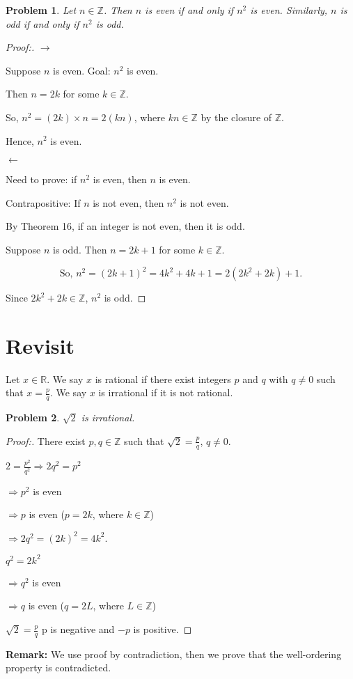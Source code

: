 \documentclass[12pt]{article}
\newtheorem{theorem}{Problem}[section]
\begin{document}
\newpage

\begin{theorem}
Let $n \in \mathbb{Z}$. Then $n$ is even if and only if $n^2$ is even. Similarly, $n$ is odd if and only if $n^2$ is odd.
\end{theorem}

\begin{proof}[Proof:]
\textbf{$\longrightarrow$}

Suppose $n$ is even. Goal: $n^2$ is even.

Then $n = 2k$ for some $k \in \mathbb{Z}$.

So, $n^2 = (2k) \times n = 2(kn)$, where $kn \in \mathbb{Z}$ by the closure of $\mathbb{Z}$.

Hence, $n^2$ is even.

\textbf{$\longleftarrow$}

Need to prove: if $n^2$ is even, then $n$ is even.

Contrapositive: If $n$ is not even, then $n^2$ is not even.

By Theorem 16, if an integer is not even, then it is odd.

Suppose $n$ is odd. Then $n = 2k + 1$ for some $k \in \mathbb{Z}$.

\[
\text{So, } n^2 = (2k + 1)^2 = 4k^2 + 4k + 1 = 2(2k^2 + 2k) + 1.
\]

Since $2k^2 + 2k \in \mathbb{Z}$, $n^2$ is odd.
\end{proof}

\newpage

\section{Revisit}

Let $x \in \mathbb{R}$. We say $x$ is rational if there exist integers $p$ and $q$ with $q \neq 0$ such that $x = \frac{p}{q}$. We say $x$ is irrational if it is not rational.

\begin{theorem}
$\sqrt{2}$ is irrational.
\end{theorem}

\begin{proof}[Proof:]
There exist $p, q \in \mathbb{Z}$ such that $\sqrt{2} = \frac{p}{q}$, $q \neq 0$.

$2 = \frac{p^2}{q^2} \Rightarrow 2q^2 = p^2$

$\Rightarrow p^2$ is even

$\Rightarrow p$ is even ($p = 2k$, where $k \in \mathbb{Z}$)

$\Rightarrow 2q^2 = (2k)^2 = 4k^2$.

$q^2 = 2k^2$

$\Rightarrow q^2$ is even

$\Rightarrow q$ is even ($q = 2L$, where $L \in \mathbb{Z}$)

$\sqrt{2} = \frac{p}{q}$ p is negative and $-p$ is positive.
\end{proof}

\textbf{Remark:} We use proof by contradiction, then we prove that the well-ordering property is contradicted.
\end{document}
